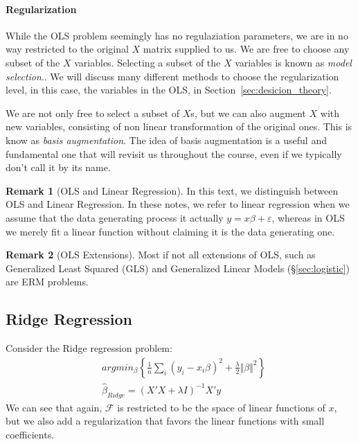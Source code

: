 \documentclass[12pt,a4paper]{article}
\theoremstyle{plain}
\theoremstyle{definition}
\newtheorem{remark}{Remark}
\newcommand{\norm}[1]{\Vert #1 \Vert}
\newcommand{\argmin}[2]{argmin_{#1}\left\{ #2 \right\}}
\newcommand{\hypclass}{\mathcal{F}}
\begin{document}
\paragraph{Regularization}
While the OLS problem seemingly has no regulaziation parameters, we are in no way restricted to the original $X$ matrix supplied to us. 
We are free to choose any subset of the $X$ variables. Selecting a subset of the $X$ variables is known as \emph{model selection}..
We will discuss many different methods to choose the regularization level, in this case, the variables in the OLS, in Section~\ref{sec:desicion_theory}.

We are not only free to select a subset of $X$s, but we can also augment $X$ with new variables, consisting of non linear transformation of the original ones. This is know as \emph{basis augmentation}. 
The idea of basis augmentation is a useful and fundamental one that will revisit us throughout the course, even if we typically don't call it by its name.

\begin{remark}[OLS and Linear Regression]
In this text, we distinguish between OLS and Linear Regression. In these notes, we refer to linear regression when we assume that the data generating process it actually $y=x\beta+\varepsilon$, whereas in OLS we merely fit a linear function without claiming it is the data generating one.
\end{remark}


\begin{remark}[OLS Extensions]
Most if not all extensions of OLS, such as Generalized Least Squared (GLS) and Generalized Linear Models (\S\ref{sec:logistic}) are ERM problems. 
\end{remark}




\subsection{Ridge Regression}
Consider the Ridge regression problem:
\begin{align}
\label{eq:ridge}
	& \argmin{\beta}{\frac{1}{n}\sum_i (y_i-x_i\beta)^2 + \frac{\lambda}{2}\norm{\beta}^2} \\
	& \hat{\beta}_{Ridge}= (X'X+\lambda I)^{-1} X'y
\end{align}
We can see that again, $\hypclass$ is restricted to be the space of linear functions of $x$, but we also add a regularization that favors the linear functions with small coefficients.
\end{document}
